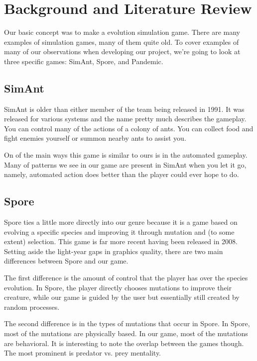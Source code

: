 
\chapter{Background and Literature Review}

Our basic concept was to make a evolution simulation game. There are many examples of simulation games, many of them quite old. To cover examples of many of our observations when developing our project, we're going to look at three specific games: SimAnt, Spore, and Pandemic.

\section{SimAnt}
SimAnt is older than either member of the team being released in 1991. It was released for various systems and the name pretty much describes the gameplay. You can control many of the actions of a colony of ants. You can collect food and fight enemies yourself or summon nearby ants to assist you.

On of the main ways this game is similar to ours is in the automated gameplay. Many of patterns we see in our game are present in SimAnt when you let it go, namely, automated action does better than the player could ever hope to do.


\section{Spore}
Spore ties a little more directly into our genre because it is a game based on evolving a specific species and improving it through mutation and (to some extent) selection. This game is far more recent having been released in 2008. Setting aside the light-year gaps in graphics quality, there are two main differences between Spore and our game.

The first difference is the amount of control that the player has over the species evolution. In Spore, the player directly chooses mutations to improve their creature, while our game is guided by the user but essentially still created by random processes.

The second difference is in the types of mutations that occur in Spore. In Spore, most of the mutations are physically based. In our game, most of the mutations are behavioral. It is interesting to note the overlap between the games though. The most prominent is predator vs. prey mentality.


